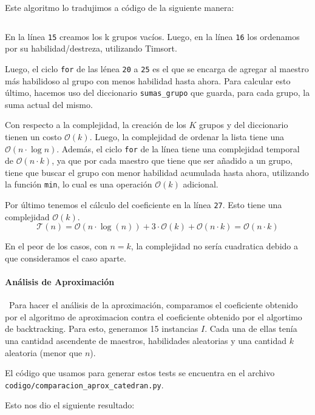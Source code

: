 \documentclass{article}
\begin{document}
Este algoritmo lo tradujimos a código de la siguiente manera:

\inputminted[linenos, firstline=3, lastline=29]{python}{codigo/aproximacion_catedra.py}

En la línea \texttt{15} creamos los k grupos vacíos. Luego, en la línea \texttt{16} los ordenamos por su habilidad/destreza, utilizando Timsort.

Luego, el ciclo \texttt{for} de las lénea \texttt{20} a \texttt{25} es el que se encarga de agregar al maestro más habilidoso al grupo con menos habilidad hasta ahora. Para calcular esto último, hacemos uso del diccionario \texttt{sumas\_grupo} que guarda, para cada grupo, la suma actual del mismo. 

Con respecto a la complejidad, la creación de los $K$ grupos y del diccionario tienen un costo $\mathcal{O}(k)$. Luego, la complejidad de ordenar la lista tiene una  $\mathcal{O}(n \cdot \log n)$.
Además, el ciclo \texttt{for} de la línea tiene  una complejidad temporal de $\mathcal{O}(n \cdot k)$, ya que por cada maestro que tiene que ser añadido a un grupo, tiene que buscar el grupo con menor habilidad acumulada hasta ahora, utilizando la función \texttt{min}, lo cual es una operación $\mathcal{O}(k)$ adicional. 

Por último tenemos el cálculo del coeficiente en la línea \texttt{27}. Esto tiene una complejidad $\mathcal{O}(k)$.
$$
\mathcal{T}(n) = \mathcal{O}(n \cdot \log (n)) + 3 \cdot \mathcal{O}(k) + \mathcal{O}(n \cdot k) = \mathcal{O}(n \cdot k)
$$

En el peor de los casos, con $n = k$, la complejidad no sería cuadratica debido a que consideramos el caso aparte.

\paragraph{Análisis de Aproximación} \
Para hacer el análisis de la aproximación, comparamos el coeficiente obtenido por el algoritmo de aproximacion contra el coeficiente obtenido por el algortimo de backtracking.
Para esto, generamos 15 instancias $I$. Cada una de ellas tenía una cantidad ascendente de maestros, habilidades aleatorias y una cantidad $k$ aleatoria (menor que $n$).

El código que usamos para generar estos tests se encuentra en el archivo \texttt{codigo/comparacion\_aprox\_catedran.py}.

Esto nos dio el siguiente resultado: 
\end{document}
